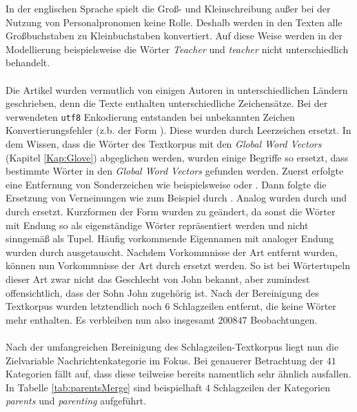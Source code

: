 \documentclass[a4paper,11pt]{article}
\begin{document}
In der englischen Sprache spielt die Groß- und Kleinschreibung außer bei der Nutzung von Personalpronomen keine Rolle. Deshalb werden in den Texten alle Großbuchstaben zu Kleinbuchstaben konvertiert. Auf diese Weise werden in der Modellierung beispielsweise die Wörter \textit{Teacher} und \textit{teacher} nicht unterschiedlich behandelt. \\
\\
Die Artikel wurden vermutlich von einigen Autoren in unterschiedlichen Ländern geschrieben, denn die Texte enthalten unterschiedliche Zeichensätze. Bei der verwendeten \texttt{utf8} Enkodierung entstanden bei unbekannten Zeichen Konvertierungsfehler (z.b. der Form ). Diese wurden durch Leerzeichen ersetzt. In dem Wissen, dass die Wörter des Textkorpus mit den \textit{Global Word Vectors} (Kapitel \ref{Kap:Glove}) abgeglichen werden, wurden einige Begriffe so ersetzt, dass bestimmte Wörter in den \textit{Global Word Vectors} gefunden werden. Zuerst erfolgte eine Entfernung von Sonderzeichen wie beispielsweise  oder . Dann folgte die Ersetzung von Verneinungen wie zum Beispiel  durch . Analog wurden  durch  und  durch  ersetzt. Kurzformen der Form  wurden zu  geändert, da sonst die Wörter mit Endung  so als eigenständige Wörter repräsentiert werden und nicht sinngemäß als Tupel. Häufig vorkommende Eigennamen mit analoger Endung  wurden durch  ausgetauscht. Nachdem Vorkommnisse der Art  entfernt wurden, können nun Vorkommnisse der Art  durch  ersetzt werden. So ist bei Wörtertupeln dieser Art zwar nicht das Geschlecht von John bekannt, aber zumindest offensichtlich, dass der Sohn John zugehörig ist. Nach der Bereinigung des Textkorpus wurden letztendlich noch $6$ Schlagzeilen entfernt, die keine Wörter mehr enthalten. Es verbleiben nun also insgesamt $200847$ Beobachtungen.\\
\\
Nach der umfangreichen Bereinigung des Schlagzeilen-Textkorpus liegt nun die Zielvariable Nachrichtenkategorie im Fokus.
Bei genauerer Betrachtung der $41$ Kategorien fällt auf, dass diese teilweise bereits namentlich sehr ähnlich ausfallen. In Tabelle \ref{tab:parentsMerge} sind beispielhaft $4$ Schlagzeilen der Kategorien \textit{parents} und \textit{parenting} aufgeführt.
\end{document}
